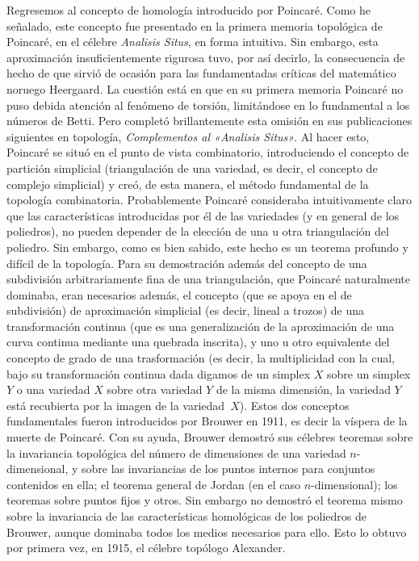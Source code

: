 \documentclass[a4paper, 12pt]{article}
\begin{document}
Regresemos al concepto de homología introducido por Poincaré. Como he señalado, este concepto fue presentado en la primera memoria topológica de Poincaré, en el célebre {\it Analisis Situs}, en forma intuitiva. Sin  embargo, esta aproximación insuficientemente rigurosa tuvo, por así decirlo, la consecuencia de hecho de que sirvió de ocasión para las fundamentadas críticas del matemático noruego Heergaard. La cuestión está en que en su primera memoria Poincaré no puso debida atención al fenómeno de torsión, limitándose en lo fundamental a los números de Betti. Pero completó brillantemente esta omisión en sus publicaciones siguientes en topología, {\it Complementos al «Analisis Situs»}. Al hacer esto, Poincaré se situó en el punto de vista combinatorio, introduciendo el concepto de partición simplicial
(triangulación de una variedad, es decir, el concepto
de complejo simplicial) y creó, de esta manera, el método fundamental de la topología combinatoria. Probablemente Poincaré consideraba intuitivamente claro que las características introducidas por él de las variedades (y en general de los poliedros), no pueden depender de la elección de una u otra triangulación del poliedro. Sin embargo, como es bien sabido, este hecho es un teorema profundo y difícil de la topología. Para su demostración además del concepto de una subdivisión arbitrariamente fina de una triangulación, que Poincaré naturalmente dominaba, eran necesarios además, el concepto (que se apoya en el de subdivisión) de aproximación simplicial (es decir, lineal a trozos) de una transformación continua (que es una generalización de la aproximación de una curva continua mediante una quebrada inscrita), y uno u otro equivalente del concepto de grado de una trasformación (es decir, la multiplicidad con la cual, bajo su transformación continua dada digamos de un simplex $X$ sobre un simplex $Y$ o una variedad $X$ sobre otra variedad $Y$ de la misma dimensión, la variedad $Y$ está recubierta por la imagen de la variedad~$X$). Estos dos conceptos fundamentales fueron introducidos por Brouwer en 1911, es decir la víspera de la muerte de Poincaré. Con su ayuda, Brouwer demostró sus célebres teoremas sobre la invariancia topológica del número de dimensiones de una variedad $n$-dimensional, y sobre las invariancias de los puntos internos para conjuntos contenidos en ella; el teorema general de Jordan (en el caso $n$-dimensional); los teoremas sobre puntos fijos y otros. Sin embargo no demostró el teorema mismo sobre la invariancia de las características homológicas de los poliedros de Brouwer, aunque dominaba todos los medios necesarios para ello. Esto lo obtuvo por primera vez, en 1915, el célebre topólogo Alexander.
\end{document}
